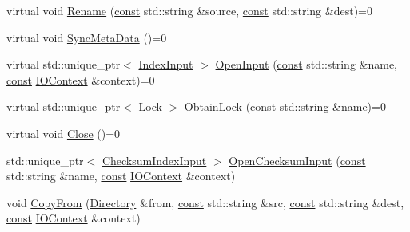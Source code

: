 \begin{DoxyCompactItemize}
\item 
virtual void \mbox{\hyperlink{classlucene_1_1core_1_1store_1_1Directory_a41371672f0e4f3d05432013778fedfb0}{Rename}} (\mbox{\hyperlink{ZlibCrc32_8h_a2c212835823e3c54a8ab6d95c652660e}{const}} std\+::string \&source, \mbox{\hyperlink{ZlibCrc32_8h_a2c212835823e3c54a8ab6d95c652660e}{const}} std\+::string \&dest)=0
\item 
virtual void \mbox{\hyperlink{classlucene_1_1core_1_1store_1_1Directory_aa5ad7f9b517071b37c7d10858480f26d}{Sync\+Meta\+Data}} ()=0
\item 
virtual std\+::unique\+\_\+ptr$<$ \mbox{\hyperlink{classlucene_1_1core_1_1store_1_1IndexInput}{Index\+Input}} $>$ \mbox{\hyperlink{classlucene_1_1core_1_1store_1_1Directory_a4889bc9f58be58f28cc6e0846fbd516c}{Open\+Input}} (\mbox{\hyperlink{ZlibCrc32_8h_a2c212835823e3c54a8ab6d95c652660e}{const}} std\+::string \&name, \mbox{\hyperlink{ZlibCrc32_8h_a2c212835823e3c54a8ab6d95c652660e}{const}} \mbox{\hyperlink{classlucene_1_1core_1_1store_1_1IOContext}{I\+O\+Context}} \&context)=0
\item 
virtual std\+::unique\+\_\+ptr$<$ \mbox{\hyperlink{classlucene_1_1core_1_1store_1_1Lock}{Lock}} $>$ \mbox{\hyperlink{classlucene_1_1core_1_1store_1_1Directory_afe0348fa3979da64289fbd4c96db5845}{Obtain\+Lock}} (\mbox{\hyperlink{ZlibCrc32_8h_a2c212835823e3c54a8ab6d95c652660e}{const}} std\+::string \&name)=0
\item 
virtual void \mbox{\hyperlink{classlucene_1_1core_1_1store_1_1Directory_aa803c099bd4963d2ed83dbe10152d909}{Close}} ()=0
\item 
std\+::unique\+\_\+ptr$<$ \mbox{\hyperlink{classlucene_1_1core_1_1store_1_1ChecksumIndexInput}{Checksum\+Index\+Input}} $>$ \mbox{\hyperlink{classlucene_1_1core_1_1store_1_1Directory_af23ff345c08fbf7b235d72919d749556}{Open\+Checksum\+Input}} (\mbox{\hyperlink{ZlibCrc32_8h_a2c212835823e3c54a8ab6d95c652660e}{const}} std\+::string \&name, \mbox{\hyperlink{ZlibCrc32_8h_a2c212835823e3c54a8ab6d95c652660e}{const}} \mbox{\hyperlink{classlucene_1_1core_1_1store_1_1IOContext}{I\+O\+Context}} \&context)
\item 
void \mbox{\hyperlink{classlucene_1_1core_1_1store_1_1Directory_a1b531f282e9f4d200bdd6e663701ff9c}{Copy\+From}} (\mbox{\hyperlink{classlucene_1_1core_1_1store_1_1Directory}{Directory}} \&from, \mbox{\hyperlink{ZlibCrc32_8h_a2c212835823e3c54a8ab6d95c652660e}{const}} std\+::string \&src, \mbox{\hyperlink{ZlibCrc32_8h_a2c212835823e3c54a8ab6d95c652660e}{const}} std\+::string \&dest, \mbox{\hyperlink{ZlibCrc32_8h_a2c212835823e3c54a8ab6d95c652660e}{const}} \mbox{\hyperlink{classlucene_1_1core_1_1store_1_1IOContext}{I\+O\+Context}} \&context)
\end{DoxyCompactItemize}
